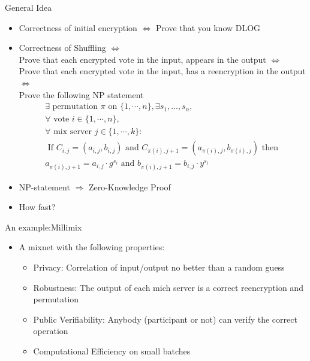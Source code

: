 \documentclass{beamer}
\begin{document}
\begin{frame}{General Idea}
\begin{itemize}
\item Correctness of initial encryption $ \Leftrightarrow $ Prove that you know DLOG
\small
\item Correctness of Shuffling\cite{Riv6897} $ \Leftrightarrow $ \\
	Prove that each encrypted vote in the input, appears in the output $ \Leftrightarrow $\\
	Prove that each encrypted vote in the input, has a reencryption in the output $ \Leftrightarrow $\\
	Prove the following NP statement 
\normalsize
\begin{align*}
\exists  \text{ permutation } \pi  \text { on }   \{1,\cdots, n \}, \exists  s_1,...,s_n, \\
\forall  \text{ vote }  i \in \{1,\cdots, n \}, \\
\forall   \text{ mix server }  j \in \{1, \cdots, k \}  :\\ 
\text{ If }  C_{i,j} = (a_{i,j},b_{i,j})  \text{ and }  C_{\pi(i),j+1} = (a_{\pi(i),j},b_{\pi(i),j})  \text{ then } \\
a_{\pi(i),j+1} = a_{i,j} \cdot g^{s_i} \text{ and }
b_{\pi(i),j+1} = b_{i,j} \cdot y^{s_i}
\end{align*}

\item NP-statement $\Rightarrow$ Zero-Knowledge Proof
\item How fast?
\end{itemize}
\end{frame}

\begin{frame}{An example:Millimix \cite{JJ99}}
\begin{itemize}
\item A mixnet with the following properties:
\begin{itemize}
\item Privacy: Correlation of input/output no better than a random guess
\item Robustness: The output of each mich server is a correct reencryption and permutation
\item Public Verifiability: Anybody (participant or not) can verify the correct operation
\item Computational Efficiency on small batches
\end{itemize}
\end{itemize}
\end{frame}
\end{document}
